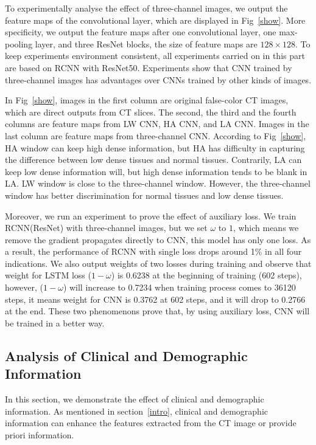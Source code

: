 \documentclass[journal]{IEEEtran}
\begin{document}
To experimentally analyse the effect of three-channel images, we output the feature maps of the convolutional layer, which are displayed in Fig~\ref{show}. More specificity, we output the feature maps after one convolutional layer, one max-pooling layer, and three ResNet blocks, the size of feature maps are $128 \times 128$. To keep experiments environment consistent, all experiments carried on in this part are based on RCNN with ResNet50. Experiments show that CNN trained by three-channel images has advantages over CNNs trained by other kinds of images.

In Fig~\ref{show}, images in the first column are original false-color CT images, which are direct outputs from CT slices. The second, the third and the fourth columns are feature maps from LW CNN, HA CNN, and LA CNN. Images in the last column are feature maps from three-channel CNN. 
According to Fig~\ref{show}, HA window can keep high dense information, but HA has difficulty in capturing the difference between low dense tissues and normal tissues. Contrarily, LA can keep low dense information will, but high dense information tends to be blank in LA. LW window is close to the three-channel window. However, the three-channel window has better discrimination for normal tissues and low dense tissues.

Moreover, we run an experiment to prove the effect of auxiliary loss. We train RCNN(ResNet) with three-channel images, but we set $\omega$ to $1$, which means we remove the gradient propagates directly to CNN, this model has only one loss. As a result, the performance of RCNN with single loss drops around 1\% in all four indications. We also output weights of two losses during training and observe that weight for LSTM loss ($1 - \omega$) is 0.6238 at the beginning of training (602 steps), however, ($1 - \omega$) will increase to 0.7234 when training process comes to 36120 steps, it means weight for CNN is 0.3762 at 602 steps, and it will drop to 0.2766 at the end. These two phenomenons prove that, by using auxiliary loss, CNN will be trained in a better way. 

\subsection{Analysis of Clinical and Demographic Information}
\label{complaintsagegender}
In this section, we demonstrate the effect of clinical and demographic information.
As mentioned in section~\ref{intro}, clinical and demographic information can enhance the features extracted from the CT image or provide priori information. 
\end{document}
